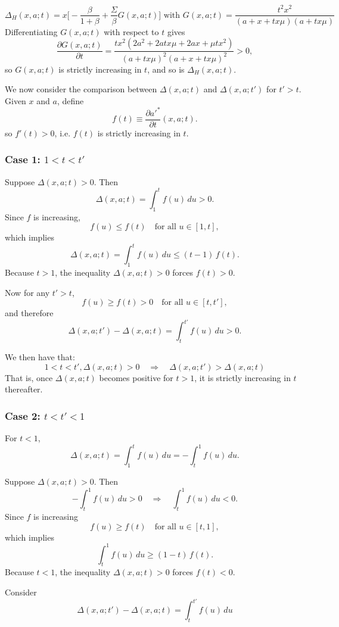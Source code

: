 \documentclass[12pt,english]{article}
\numberwithin{equation}{section}
\begin{document}
{\[\Delta_{H}(x,a;t) = x\big[-\frac{\beta}{1+\beta} + \frac{\Sigma}{\beta}G(x,a;t)\big] \text{ with } G(x,a;t) = \frac{t^2x^2}{(a+x+tx\mu)(a+tx\mu)}
\]
Differentiating $G(x,a;t)$ with respect to $t$ gives
\[
\frac{\partial G(x,a;t)}{\partial t}
=\frac{tx^2(2a^2+2atx\mu+2ax+\mu t x^2)}{(a+ tx\mu)^2(a+x+tx\mu)^2}
>0,
\]
so $G(x,a;t)$ is strictly increasing in $t$, and so is $\Delta_{H}(x,a;t)$.

\bigskip\noindent
We now consider the comparison between $\Delta(x,a;t)$ and $\Delta(x,a;t')$ for $t'>t$.
Given $x$ and $a$, define
\[
f(t)\equiv \frac{\partial a'^*}{\partial t}(x,a;t).
\]
so $f'(t)>0$, i.e. $f(t)$ is strictly increasing in $t$.

\subsubsection*{Case 1: $1<t<t'$}

Suppose $\Delta(x,a;t)>0$. Then
\[
\Delta(x,a;t)
=\int_{1}^{t} f(u)\,du>0.
\]
Since $f$ is increasing,
\[
f(u)\le f(t)\quad\text{for all } u\in[1,t],
\]
which implies
\[
\Delta(x,a;t)
=\int_{1}^{t} f(u)\,du
\le (t-1)\,f(t).
\]
Because $t>1$, the inequality $\Delta(x,a;t)>0$ forces $f(t)>0$.

Now for any $t'>t$,
\[
f(u)\ge f(t)>0
\quad\text{for all }u\in[t,t'],
\]
and therefore
\[
\Delta(x,a;t')-\Delta(x,a;t)
=
\int_{t}^{t'} f(u)\,du
>0.
\]

We then have that:
\begin{equation}
1<t<t', \Delta(x,a;t)>0
\quad\Longrightarrow\quad
\Delta(x,a;t')>\Delta(x,a;t)
\end{equation}
That is, once $\Delta(x,a;t)$ becomes positive for $t>1$, it is strictly increasing in $t$ thereafter.

\subsubsection*{Case 2: $t<t'<1$}

For $t<1$,
\[
\Delta(x,a;t)
=\int_{1}^{t} f(u)\,du
= -\int_{t}^{1} f(u)\,du.
\]

Suppose $\Delta(x,a;t)>0$. Then
\[
-\int_{t}^{1} f(u)\,du>0
\quad\Longrightarrow\quad
\int_{t}^{1} f(u)\,du<0.
\]
Since $f$ is increasing 
\[
f(u)\ge f(t)\quad\text{for all } u\in[t,1],
\]
which implies
\[
\int_{t}^{1} f(u)\,du
\ge (1-t)\,f(t).
\]
Because $t<1$, the inequality $\Delta(x,a;t)>0$ forces $f(t)<0$.

Consider 
\[
\Delta(x,a;t')-\Delta(x,a;t)
=\int_{t}^{t'} f(u)\,du
\]

}
\end{document}
